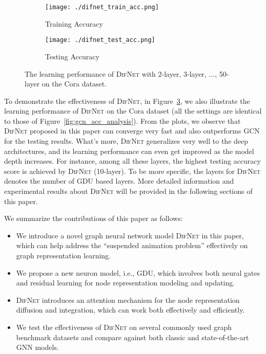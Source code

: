 \documentclass{article}
\newcommand{\our}{\textsc{DifNet}}
\newcommand{\gdu}{\textsc{GDU}}
\newcommand{\gcn}{\textsc{GCN}}
\begin{document}
\begin{figure}
    \centering
    \begin{subfigure}[b]{.23\textwidth}
    	\texttt{[image: ./difnet\_train\_acc.png]}
    	\caption{Training Accuracy}\label{fig:difnet_acc_train}
    \end{subfigure}\hfill
    \begin{subfigure}[b]{.23\textwidth}
    	\texttt{[image: ./difnet\_test\_acc.png]}
    	\caption{Testing Accuracy}\label{fig:difnet_acc_test}
    \end{subfigure}\caption{{The learning performance of {\our} with 2-layer, 3-layer, $\dotsc$, 50-layer on the Cora dataset.}}\label{fig:difnet_acc_analysis}
\end{figure}


To demonstrate the effectiveness of {\our}, in Figure~\ref{fig:difnet_acc_analysis}, we also illustrate the learning performance of {\our} on the Cora dataset (all the settings are identical to those of Figure~\ref{fig:gcn_acc_analysis}). From the plots, we observe that {\our} proposed in this paper can converge very fast and also outperforms {\gcn} for the testing results. What's more, {\our} generalizes very well to the deep architectures, and its learning performance can even get improved as the model depth increases. For instance, among all these layers, the highest testing accuracy score is achieved by {\our} (10-layer). To be more specific, the layers for {\our} denotes the number of {\gdu} based layers. More detailed information and experimental results about {\our} will be provided in the following sections of this paper.

We summarize the contributions of this paper as follows:
\begin{itemize}
\item We introduce a novel graph neural network model {\our} in this paper, which can help address the ``suspended animation problem'' effectively on graph representation learning.
\item We propose a new neuron model, i.e., {\gdu}, which involves both neural gates and residual learning for node representation modeling and updating.
\item {\our} introduces an attention mechanism for the node representation diffusion and integration, which can work both effectively and efficiently. 
\item We test the effectiveness of {\our} on several commonly used graph benchmark datasets and compare against both classic and state-of-the-art GNN models.
\end{itemize}
\end{document}
